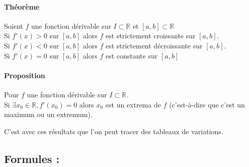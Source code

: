 \documentclass[11pt]{article}
\newcommand{\R}{\mathbb R}
\begin{document}
        \paragraph{Théorème} Soient $f$ une fonction dérivable sur $I\subset\R$ et $[a,b]\subset\R$\\
        Si $f'(x)>0$ sur $[a,b]$ alors $f$ est strictement croissante sur $[a,b]$.\\
        Si $f'(x)<0$ sur $[a,b]$ alors $f$ est strictement décroissante sur $[a,b]$.\\
        Si $f'(x)=0$ sur $[a,b]$ alors $f$ est constante sur $[a,b]$

        \paragraph{Proposition} Pour $f$ une fonction dérivable sur $I\subset \R$.\\
        Si $\exists x_0 \in \R, f'(x_0)=0$ alors $x_0$ est un extrema de $f$ (c'est-à-dire que c'est un maximum ou un extremum).
        
        C'est avec ces résultats que l'on peut tracer des tableaux de variations.

        \subsection{Formules :}
       
\end{document}
